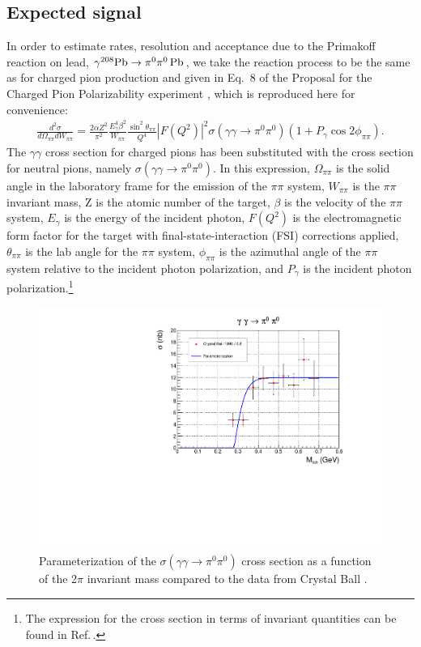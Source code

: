 \subsection{Expected signal}
In order to estimate rates, resolution and acceptance due to the
Primakoff reaction on lead, $\gamma ^{208}\rm{Pb}\rightarrow \pi^0
\pi^0\, \rm{Pb}$, we take the reaction process to be the same as for
charged pion production and given in Eq.~8 of the Proposal for the
Charged Pion Polarizability experiment \cite{CPPexp}, which is
reproduced here for convenience:
\begin{eqnarray}
\frac{d^2\sigma}{d\Omega_{\pi\pi}dW_{\pi\pi}} = \frac{2\alpha Z^2}{\pi^2} \frac{E^4_\gamma \beta^2}{W_{\pi\pi}} \frac{\sin^2\theta_{\pi\pi}}{Q^4} |F(Q^2)|^2 \sigma(\gamma\gamma\rightarrow\pi^0\pi^0) (1+P_\gamma \cos{2\phi_{\pi\pi}}).   \label{eq:PrimakoffSignal}
\end{eqnarray}
The $\gamma\gamma$ cross section for charged pions has been
substituted with the cross section for neutral pions, namely
$\sigma(\gamma\gamma\rightarrow\pi^0\pi^0)$. In this expression,
$\Omega_{\pi\pi}$ is the solid angle in the laboratory frame for the
emission of the $\pi\pi$ system, $W_{\pi\pi}$ is the $\pi\pi$
invariant mass, Z is the atomic number of the target, $\beta$ is the
velocity of the $\pi\pi$ system, $E_\gamma$ is the energy of the
incident photon, $F(Q^2)$ is the electromagnetic form factor for the
target with final-state-interaction (FSI) corrections applied,
$\theta_{\pi\pi}$ is the lab angle for the $\pi\pi$ system,
$\phi_{\pi\pi}$ is the azimuthal angle of the $\pi\pi$ system relative
to the incident photon polarization, and $P_\gamma$ is the incident
photon polarization.\footnote{The expression for the cross section in
  terms of invariant quantities can be found in
  Ref.\,\cite{hdnote3186}.}
\begin{figure}[tph]
\centering
\includegraphics[page=1,width=4.75in]{figures/sigma_2pi0_figs.pdf}
\caption{Parameterization of the $\sigma(\gamma\gamma\rightarrow \pi^0\pi^0)$ cross section as a function
of the 2$\pi$ invariant mass compared to the data from Crystal Ball \cite{Marsiske:1990hx}.
\label{fig:sigma_2pi0_figs_1}}
\end{figure}

